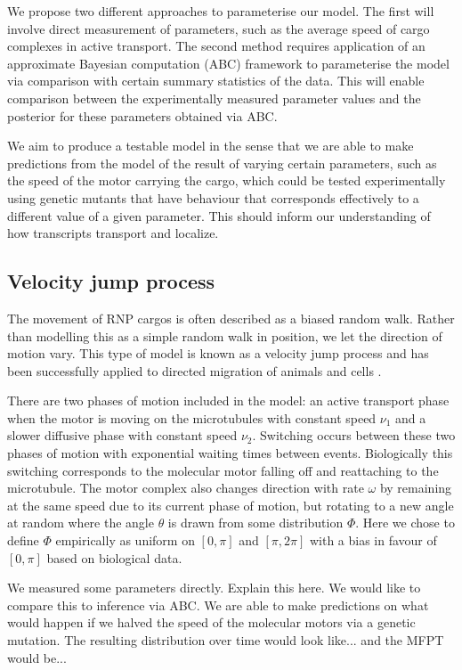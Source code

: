 \documentclass[twocolumn]{biophys}
\begin{document}
We propose two different approaches to parameterise our model. 
The first will involve direct measurement of parameters, such as the average speed of cargo complexes in active transport.
The second method requires application of an approximate Bayesian computation (ABC) framework \citep{johnston2014interpreting, turner2012tutorial, beaumont2002approximate} to parameterise the model via comparison with certain summary statistics of the data.
This will enable comparison between the experimentally measured parameter values and the posterior for these parameters obtained via ABC.

We aim to produce a testable model in the sense that we are able to make predictions from the model of the result of varying certain parameters, such as the speed of the motor carrying the cargo, which could be tested experimentally using genetic mutants that have behaviour that corresponds effectively to a different value of a given parameter. 
This should inform our understanding of how transcripts transport and localize.

\subsection{Velocity jump process}
The movement of RNP cargos is often described as a biased random walk. Rather than modelling this as a simple random walk in position, we let the direction of motion vary. 
This type of model is known as a velocity jump process and has been successfully applied to directed migration of animals and cells \citep{codling2005calculating}.

There are two phases of motion included in the model: an active transport phase when the motor is moving on the microtubules with constant speed $\nu_1$ and a slower diffusive phase with constant speed $\nu_2$.
Switching occurs between these two phases of motion with exponential waiting times between events.
Biologically this switching corresponds to the molecular motor falling off and reattaching to the microtubule.
The motor complex also changes direction with rate $\omega$ by remaining at the same speed due to its current phase of motion, but rotating to a new angle at random where the angle $\theta $ is drawn from some distribution $\Phi$. 
Here we chose to define $\Phi$ empirically as uniform on $[0,\pi ]$ and $[\pi, 2\pi ]$ with a bias in favour of $[0,\pi ]$ based on biological data.


We measured some parameters directly. Explain this here. We would like to compare this to inference via ABC.
We are able to make predictions on what would happen if we halved the speed of the molecular motors via a genetic mutation. The resulting distribution over time would look like... and the MFPT would be...
\end{document}
